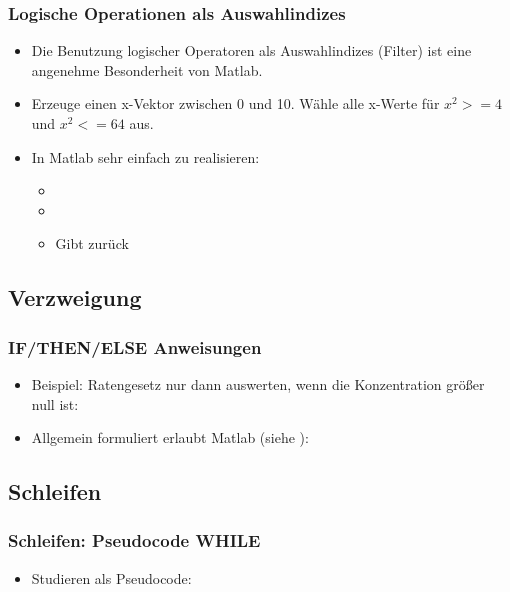       \begin{frame}
          \frametitle{Logische Operationen als Auswahlindizes}
          \begin{itemize}
            \item Die Benutzung logischer Operatoren als Auswahlindizes (Filter) ist eine angenehme Besonderheit von Matlab.
            \item Erzeuge einen x-Vektor zwischen 0 und 10. Wähle alle x-Werte für $x^2>=4$ und $x^2<=64$ aus.
            \item In Matlab sehr einfach zu realisieren:
            \begin{itemize}
              \item {}
              \item {}
              \item Gibt \matlabOutput{[2 3 4 5 6 7 8]} zurück
            \end{itemize}
          \end{itemize}
        \end{frame}

      \subsection{Verzweigung}
      \begin{frame}
          \frametitle{IF/THEN/ELSE Anweisungen}
          \begin{itemize}
            \item Beispiel: Ratengesetz nur dann auswerten, wenn die Konzentration größer null ist:
            
            \item Allgemein formuliert erlaubt Matlab (siehe ):
            
          \end{itemize}
      \end{frame}

      \subsection{Schleifen}
	  \begin{frame}
          \frametitle{Schleifen: Pseudocode WHILE}
           \begin{itemize}
             \item Studieren als Pseudocode:
             
          \end{itemize}
      \end{frame}


